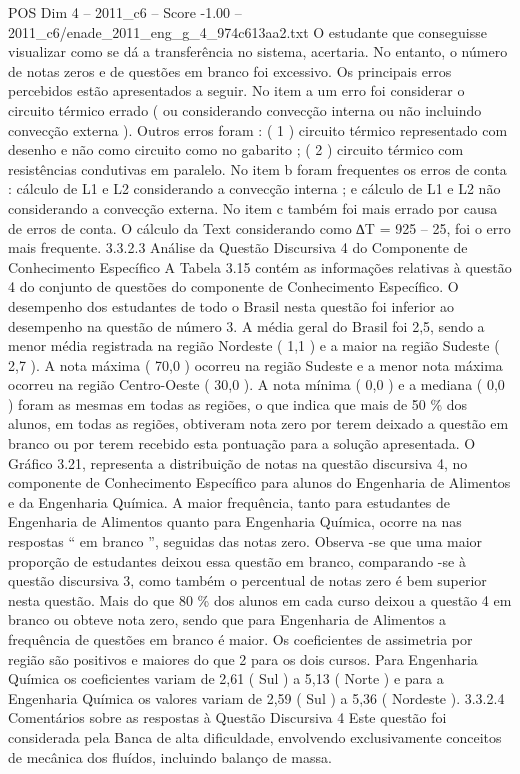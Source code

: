\begin{textsample}{POS Dim 4 – 2011\_c6 – Score -1.00 – 2011\_c6/enade\_2011\_eng\_g\_4\_974c613aa2.txt}
O estudante que conseguisse visualizar como se dá a transferência no sistema, acertaria.
No entanto, o número de notas zeros e de questões em branco foi excessivo.
Os principais erros percebidos estão apresentados a seguir.
No item a um erro foi considerar o circuito térmico errado ( ou considerando convecção interna ou não incluindo convecção externa ).
Outros erros foram : ( 1 ) circuito térmico representado com desenho e não como circuito como no gabarito ; ( 2 ) circuito térmico com resistências condutivas em paralelo.
No item b foram frequentes os erros de conta : cálculo de L1 e L2 considerando a convecção interna ; e cálculo de L1 e L2 não considerando a convecção externa.
No item c também foi mais errado por causa de erros de conta.
O cálculo da Text considerando como ∆T = 925 – 25, foi o erro mais frequente. 3.3.2.3 Análise da Questão Discursiva 4 do Componente de Conhecimento Específico A Tabela 3.15 contém as informações relativas à questão 4 do conjunto de questões do componente de Conhecimento Específico.
O desempenho dos estudantes de todo o Brasil nesta questão foi inferior ao desempenho na questão de número 3.
A média geral do Brasil foi 2,5, sendo a menor média registrada na região Nordeste ( 1,1 ) e a maior na região Sudeste ( 2,7 ).
A nota máxima ( 70,0 ) ocorreu na região Sudeste e a menor nota máxima ocorreu na região Centro-Oeste ( 30,0 ).
A nota mínima ( 0,0 ) e a mediana ( 0,0 ) foram as mesmas em todas as regiões, o que indica que mais de 50 \% dos alunos, em todas as regiões, obtiveram nota zero por terem deixado a questão em branco ou por terem recebido esta pontuação para a solução apresentada.
O Gráfico 3.21, representa a distribuição de notas na questão discursiva 4, no componente de Conhecimento Específico para alunos do Engenharia de Alimentos e da Engenharia Química.
A maior frequência, tanto para estudantes de Engenharia de Alimentos quanto para Engenharia Química, ocorre na nas respostas “ em branco ”, seguidas das notas zero.
Observa -se que uma maior proporção de estudantes deixou essa questão em branco, comparando -se à questão discursiva 3, como também o percentual de notas zero é bem superior nesta questão.
Mais do que 80 \% dos alunos em cada curso deixou a questão 4 em branco ou obteve nota zero, sendo que para Engenharia de Alimentos a frequência de questões em branco é maior.
Os coeficientes de assimetria por região são positivos e maiores do que 2 para os dois cursos.
Para Engenharia Química os coeficientes variam de 2,61 ( Sul ) a 5,13 ( Norte ) e para a Engenharia Química os valores variam de 2,59 ( Sul ) a 5,36 ( Nordeste ). 3.3.2.4 Comentários sobre as respostas à Questão Discursiva 4 Este questão foi considerada pela Banca de alta dificuldade, envolvendo exclusivamente conceitos de mecânica dos fluídos, incluindo balanço de massa.

\end{textsample}
